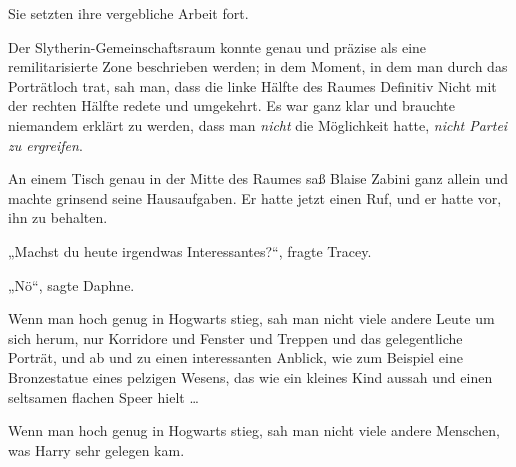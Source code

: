 Sie setzten ihre vergebliche Arbeit fort.


Der Slytherin-Gemeinschaftsraum konnte genau und präzise als eine remilitarisierte Zone beschrieben werden; in dem Moment, in dem man durch das Porträtloch trat, sah man, dass die linke Hälfte des Raumes Definitiv Nicht mit der rechten Hälfte redete und umgekehrt. Es war ganz klar und brauchte niemandem erklärt zu werden, dass man \emph{nicht} die Möglichkeit hatte, \emph{nicht Partei zu ergreifen}.

An einem Tisch genau in der Mitte des Raumes saß Blaise Zabini ganz allein und machte grinsend seine Hausaufgaben. Er hatte jetzt einen Ruf, und er hatte vor, ihn zu behalten.


„Machst du heute irgendwas Interessantes?“, fragte Tracey.

„Nö“, sagte Daphne.


Wenn man hoch genug in Hogwarts stieg, sah man nicht viele andere Leute um sich herum, nur Korridore und Fenster und Treppen und das gelegentliche Porträt, und ab und zu einen interessanten Anblick, wie zum Beispiel eine Bronzestatue eines pelzigen Wesens, das wie ein kleines Kind aussah und einen seltsamen flachen Speer hielt …

Wenn man hoch genug in Hogwarts stieg, sah man nicht viele andere Menschen, was Harry sehr gelegen kam.

